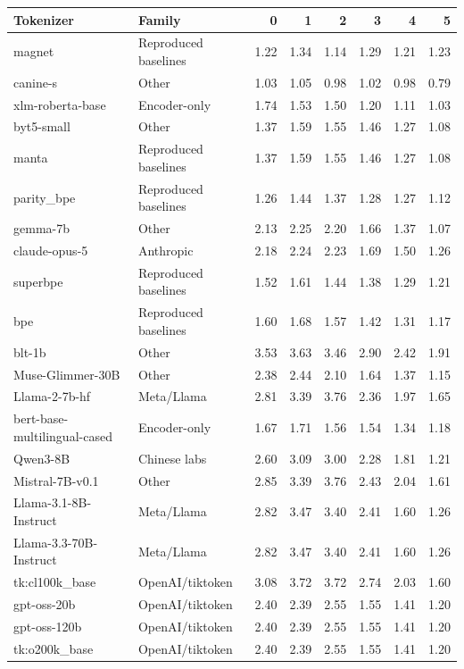 \documentclass{standalone}
\begin{document}
\begin{tabular}{llrrrrrr}
\toprule
Tokenizer & Family & 0 & 1 & 2 & 3 & 4 & 5 \\
\midrule
magnet & Reproduced baselines & 1.22 & 1.34 & 1.14 & 1.29 & 1.21 & 1.23 \\
canine-s & Other & 1.03 & 1.05 & 0.98 & 1.02 & 0.98 & 0.79 \\
xlm-roberta-base & Encoder-only & 1.74 & 1.53 & 1.50 & 1.20 & 1.11 & 1.03 \\
byt5-small & Other & 1.37 & 1.59 & 1.55 & 1.46 & 1.27 & 1.08 \\
manta & Reproduced baselines & 1.37 & 1.59 & 1.55 & 1.46 & 1.27 & 1.08 \\
parity\_bpe & Reproduced baselines & 1.26 & 1.44 & 1.37 & 1.28 & 1.27 & 1.12 \\
gemma-7b & Other & 2.13 & 2.25 & 2.20 & 1.66 & 1.37 & 1.07 \\
claude-opus-5 & Anthropic & 2.18 & 2.24 & 2.23 & 1.69 & 1.50 & 1.26 \\
superbpe & Reproduced baselines & 1.52 & 1.61 & 1.44 & 1.38 & 1.29 & 1.21 \\
bpe & Reproduced baselines & 1.60 & 1.68 & 1.57 & 1.42 & 1.31 & 1.17 \\
blt-1b & Other & 3.53 & 3.63 & 3.46 & 2.90 & 2.42 & 1.91 \\
Muse-Glimmer-30B & Other & 2.38 & 2.44 & 2.10 & 1.64 & 1.37 & 1.15 \\
Llama-2-7b-hf & Meta/Llama & 2.81 & 3.39 & 3.76 & 2.36 & 1.97 & 1.65 \\
bert-base-multilingual-cased & Encoder-only & 1.67 & 1.71 & 1.56 & 1.54 & 1.34 & 1.18 \\
Qwen3-8B & Chinese labs & 2.60 & 3.09 & 3.00 & 2.28 & 1.81 & 1.21 \\
Mistral-7B-v0.1 & Other & 2.85 & 3.39 & 3.76 & 2.43 & 2.04 & 1.61 \\
Llama-3.1-8B-Instruct & Meta/Llama & 2.82 & 3.47 & 3.40 & 2.41 & 1.60 & 1.26 \\
Llama-3.3-70B-Instruct & Meta/Llama & 2.82 & 3.47 & 3.40 & 2.41 & 1.60 & 1.26 \\
tk:cl100k\_base & OpenAI/tiktoken & 3.08 & 3.72 & 3.72 & 2.74 & 2.03 & 1.60 \\
gpt-oss-20b & OpenAI/tiktoken & 2.40 & 2.39 & 2.55 & 1.55 & 1.41 & 1.20 \\
gpt-oss-120b & OpenAI/tiktoken & 2.40 & 2.39 & 2.55 & 1.55 & 1.41 & 1.20 \\
tk:o200k\_base & OpenAI/tiktoken & 2.40 & 2.39 & 2.55 & 1.55 & 1.41 & 1.20 \\

\end{tabular}
\end{document}

